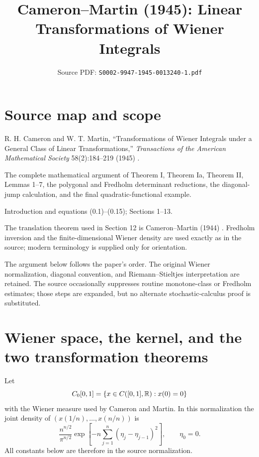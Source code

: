 
\title{Cameron--Martin (1945): Linear Transformations of Wiener Integrals}
\author{}
\date{Source PDF: \texttt{S0002-9947-1945-0013240-1.pdf}}

\maketitle

\section*{Source map and scope}
\begin{sourceguide}
\item[Primary source] R. H. Cameron and W. T. Martin, ``Transformations of Wiener Integrals under a General Class of Linear Transformations,'' \emph{Transactions of the American Mathematical Society} 58(2):184--219 (1945) \cite{CameronMartin1945}.
\item[Coverage] The complete mathematical argument of Theorem I, Theorem Ia, Theorem II, Lemmas 1--7, the polygonal and Fredholm determinant reductions, the diagonal-jump calculation, and the final quadratic-functional example.
\item[Source order] Introduction and equations (0.1)--(0.15); Sections 1--13.
\item[Supplemental references] The translation theorem used in Section 12 is Cameron--Martin (1944) \cite{CameronMartin1944Translations}. Fredholm inversion and the finite-dimensional Wiener density are used exactly as in the source; modern terminology is supplied only for orientation.
\end{sourceguide}

The argument below follows the paper's order.  The original Wiener normalization, diagonal convention, and Riemann--Stieltjes interpretation are retained.  The source occasionally suppresses routine monotone-class or Fredholm estimates; those steps are expanded, but no alternate stochastic-calculus proof is substituted.

\section{Wiener space, the kernel, and the two transformation theorems}
Let
\[
 C_0[0,1]=\{x\in C([0,1],\mathbb{R}):x(0)=0\}
\]
with the Wiener measure used by Cameron and Martin.  In this normalization the joint density of
\((x(1/n),\ldots,x(n/n))\) is
\[
 \frac{n^{n/2}}{\pi^{n/2}}
 \exp\!\left[-n\sum_{j=1}^n(\eta_j-\eta_{j-1})^2\right],
 \qquad \eta_0=0.
\]
All constants below are therefore in the source normalization.

